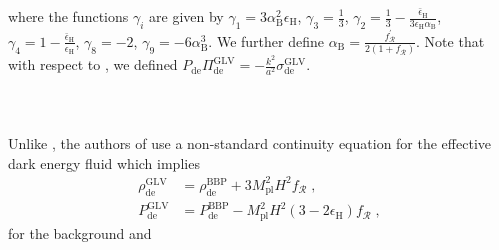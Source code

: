 \documentclass[nofootinbib,a4paper,aps,prd,10pt,superscriptaddress,reprint,showkeys,showpacs]{revtex4-1}
\newcommand{\qsubrm}[2]{{#1}_{\scriptscriptstyle{\textrm{#2}}}}
\begin{document}
where the functions $\gamma_i$ are given by $\qsubrm{\gamma}{1} = 3\qsubrm{\alpha}{B}^2\qsubrm{\epsilon}{H}$, 
$\qsubrm{\gamma}{3} = \tfrac{1}{3}$, 
$\qsubrm{\gamma}{2} = \tfrac{1}{3}-\frac{\qsubrm{\bar{\epsilon}}{H}}{3\qsubrm{\epsilon}{H}\qsubrm{\alpha}{B}}$, 
$\qsubrm{\gamma}{4}=1-\tfrac{\qsubrm{\bar{\epsilon}}{H}}{\qsubrm{\epsilon}{H}}$, $\qsubrm{\gamma}{8} = -2$, 
$\qsubrm{\gamma}{9} = -6\qsubrm{\alpha}{B}^3$. We further define  
$\qsubrm{\alpha}{B} = \tfrac{f^{\prime}_{\mathcal{R}}}{2(1+f_{\mathcal{R}})}$. Note that with respect to 
\cite{Gleyzes2014}, we defined 
$\qsubrm{P}{de}\qsubrm{\Pi}{de}^{{\scriptscriptstyle{\textrm{GLV}}}}=
-\tfrac{k^2}{a^2}\qsubrm{\sigma}{de}^{{\scriptscriptstyle{\textrm{GLV}}}}$.\\
\\
\\
\\
Unlike \cite{Battye2016}, the authors of \cite{Gleyzes2014} use a non-standard continuity equation for the effective 
dark energy fluid which implies
\begin{align}
 \qsubrm{\rho}{de}^{{\scriptscriptstyle{\textrm{GLV}}}} & = 
 \qsubrm{\rho}{de}^{{\scriptscriptstyle{\textrm{BBP}}}}+3\qsubrm{M}{pl}^2H^2f_{\mathcal{R}}\;,\nonumber\\
 \qsubrm{P}{de}^{{\scriptscriptstyle{\textrm{GLV}}}} & = 
 \qsubrm{P}{de}^{{\scriptscriptstyle{\textrm{BBP}}}}-
 \qsubrm{M}{pl}^2H^2\left(3-2\qsubrm{\epsilon}{H}\right)f_{\mathcal{R}}\;,\nonumber
\end{align}
for the background and
\end{document}
